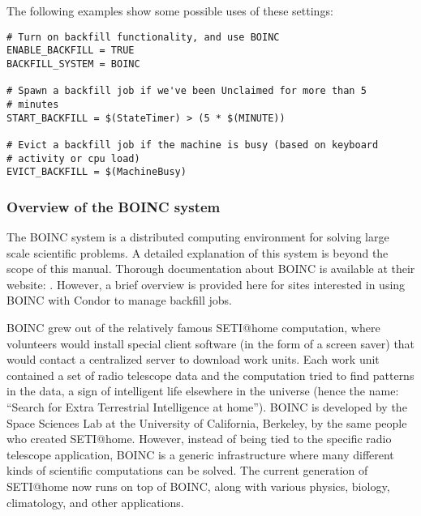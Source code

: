 The following examples show some possible uses of these settings:

\footnotesize
\begin{verbatim}
# Turn on backfill functionality, and use BOINC
ENABLE_BACKFILL = TRUE
BACKFILL_SYSTEM = BOINC

# Spawn a backfill job if we've been Unclaimed for more than 5
# minutes 
START_BACKFILL = $(StateTimer) > (5 * $(MINUTE))

# Evict a backfill job if the machine is busy (based on keyboard
# activity or cpu load)
EVICT_BACKFILL = $(MachineBusy)
\end{verbatim}
\normalsize


\subsubsection{\label{sec:Backfill-BOINC-overview}Overview of the
 BOINC system}


The BOINC system is a distributed computing environment for solving
large scale scientific problems.
A detailed explanation of this system is beyond the scope of this
manual.
Thorough documentation about BOINC is available at their website:
.
However, a brief overview is provided here for sites interested in
using BOINC with Condor to manage backfill jobs. 

BOINC grew out of the relatively famous SETI@home computation, where
volunteers would install special client software (in the form of a
screen saver) that would contact a centralized server to download work
units.
Each work unit contained a set of radio telescope data and the
computation tried to find patterns in the data, a sign of intelligent
life elsewhere in the universe (hence the name: ``Search for Extra
Terrestrial Intelligence at home'').
BOINC is developed by the Space Sciences Lab at the University of
California, Berkeley, by the same people who created SETI@home.
However, instead of being tied to the specific radio telescope
application, BOINC is a generic infrastructure where many different
kinds of scientific computations can be solved.
The current generation of SETI@home now runs on top of BOINC, along
with various physics, biology, climatology, and other applications.

